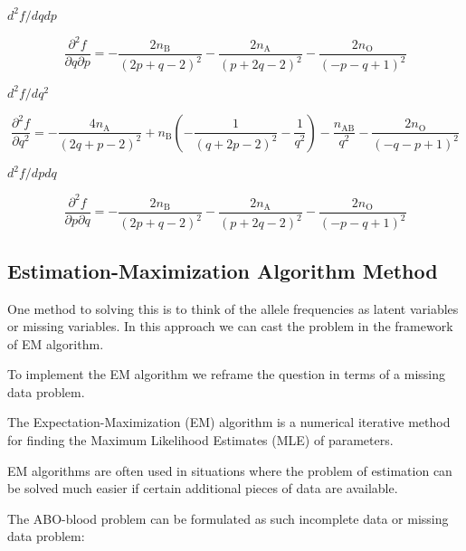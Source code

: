 \documentclass[]{article}
\begin{document}
\(d^2f/dqdp\)

\[\frac{\partial^2 f}{\partial q \partial p } = -\dfrac{2n_\text{B}}{\left(2p+q-2\right)^2}-\dfrac{2n_\text{A}}{\left(p+2q-2\right)^2}-\dfrac{2n_\text{O}}{\left(-p-q+1\right)^2}
\]

\(d^2f/dq^2\)

\[ \frac{\partial^2 f}{\partial q^2} = -\dfrac{4n_\text{A}}{\left(2q+p-2\right)^2}+n_\text{B}\left(-\dfrac{1}{\left(q+2p-2\right)^2}-\dfrac{1}{q^2}\right)-\dfrac{n_\text{AB}}{q^2}-\dfrac{2n_\text{O}}{\left(-q-p+1\right)^2}
\]

\(d^2f/dpdq\)

\[\frac{\partial^2 f}{\partial p \partial q } =-\dfrac{2n_\text{B}}{\left(2p+q-2\right)^2}-\dfrac{2n_\text{A}}{\left(p+2q-2\right)^2}-\dfrac{2n_\text{O}}{\left(-p-q+1\right)^2}
\]

\subsection{Estimation-Maximization Algorithm
Method}\label{estimation-maximization-algorithm-method}

One method to solving this is to think of the allele frequencies as
latent variables or missing variables. In this approach we can cast the
problem in the framework of EM algorithm.

To implement the EM algorithm we reframe the question in terms of a
missing data problem.

\item 

The Expectation-Maximization (EM) algorithm is a numerical iterative
method for finding the Maximum Likelihood Estimates (MLE) of parameters.
\smallskip

\item 

EM algorithms are often used in situations where the problem of
estimation can be solved much easier if certain additional pieces of
data are available. \pagebreak

\item 

The ABO-blood problem can be formulated as such incomplete data or
missing data problem:
\end{document}
